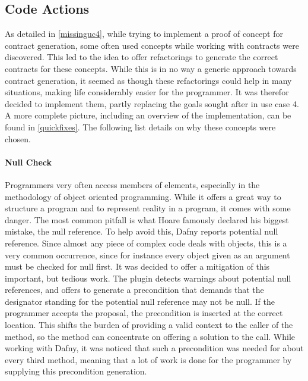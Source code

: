 \subsection{Code Actions}\label{addCodeActions}
As detailed in \ref{missinguc4}, while trying to implement a proof of concept for contract generation, some often used concepts while working with contracts were discovered. This led to the idea to offer refactorings to generate the correct contracts for these concepts. While this is in no way a generic approach towards contract generation, it seemed as though these refactorings could help in many situations, making life considerably easier for the programmer. It was therefor decided to implement them, partly replacing the goals sought after in use case 4. A more complete picture, including an overview of the implementation, can be found in \ref{quickfixes}. The following list details on why these concepts were chosen. \newline
 
\paragraph{Null Check}
Programmers very often access members of elements, especially in the methodology of object oriented programming. While it offers a great way to structure a program and to represent reality in a program, it comes with some danger. The most common pitfall is what Hoare famously declared his biggest mistake\cite{hoare}, the null reference. To help avoid this, Dafny reports potential null reference. Since almost any piece of complex code deals with objects, this is a very common occurrence, since for instance every object given as an argument must be checked for null first. \newline
It was decided to offer a mitigation of this important, but tedious work. The plugin detects warnings about potential null references, and offers to generate a precondition that demands that the designator standing for the potential null reference may not be null. If the programmer accepts the proposal, the precondition is inserted at the correct location. This shifts the burden of providing a valid context to the caller of the method, so the method can concentrate on offering a solution to the call. While working with Dafny, it was noticed that such a precondition was needed for about every third method, meaning that a lot of work is done for the programmer by supplying this precondition generation.
